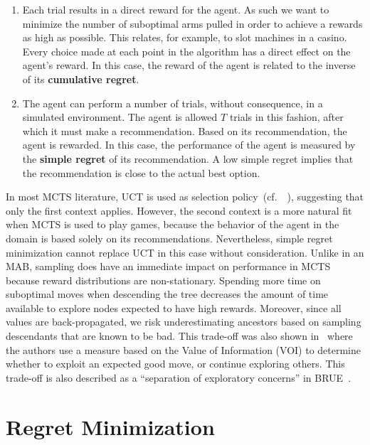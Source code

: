 \documentclass[a4paper]{llncs}
\newcommand{\cf}{{cf.}~}
\begin{document}
\begin{enumerate}

\item Each trial results in a direct reward for the agent. As such we want to minimize the number of suboptimal arms pulled in order to achieve a rewards as high as possible. This relates, for example, to slot machines in a casino. Every choice made at each point in the algorithm has a direct effect on the agent's reward. In this case, the reward of the agent is related to the inverse of its \textbf{cumulative regret}.

\item The agent can perform a number of trials, without consequence, in a simulated environment. The agent is allowed $T$ trials in this fashion, after which it must make a recommendation. Based on its recommendation, the agent is rewarded. In this case, the performance of the agent is measured by the \textbf{simple regret} of its recommendation. A low simple regret implies that the recommendation is close to the actual best option.

\end{enumerate}

In most MCTS literature, UCT is used as selection policy~(\cf~\cite{browne2012survey}), suggesting that only the first context applies. However, the second context is a more natural fit when MCTS is used to play games, because the behavior of the agent in the domain is based solely on its recommendations. Nevertheless, simple regret minimization cannot replace UCT in this case without consideration. Unlike in an MAB, sampling does have an immediate impact on performance in MCTS because reward distributions are non-stationary. 
Spending more time on suboptimal moves when descending the tree decreases the amount of time available to explore nodes expected to have high rewards. Moreover, since all values are back-propagated, we risk underestimating ancestors based on sampling descendants that are known to be bad. This trade-off was also shown in~\cite{tolpin2012mcts} where the authors use a measure based on the Value of Information (VOI) to determine whether to exploit an expected good move, or continue exploring others. This trade-off is also described as a ``separation of exploratory concerns'' in BRUE~\cite{Feldman12BRUE}.

\section{Regret Minimization}
\label{sec:reg_min}
\end{document}
